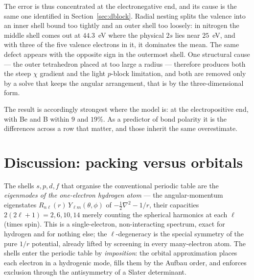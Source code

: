 \documentclass[11pt]{article}
\begin{document}
The error is thus concentrated at the electronegative end, and its cause is the same one
identified in Section~\ref{sec:dblock}. Radial nesting splits the valence into an inner
shell bound too tightly and an outer shell too loosely: in nitrogen the middle shell comes
out at $44.3$~eV where the physical $2s$ lies near $25$~eV, and with three of the five
valence electrons in it, it dominates the mean. The same defect appears with the opposite
sign in the outermost shell. One structural cause --- the outer tetrahedron placed at too
large a radius --- therefore produces both the steep $\chi$ gradient and the light
$p$-block limitation, and both are removed only by a solve that keeps the angular
arrangement, that is by the three-dimensional form.

The result is accordingly strongest where the model is: at the electropositive end, with
Be and B within $9$ and $19\%$. As a predictor of bond polarity it is the differences
across a row that matter, and those inherit the same overestimate.

\section{Discussion: packing versus orbitals}\label{sec:discussion}

The shells $s,p,d,f$ that organise the conventional periodic table are the
\emph{eigenmodes of the one-electron hydrogen atom} --- the angular-momentum
eigenstates $R_{n\ell}(r)\,Y_{\ell m}(\theta,\phi)$ of $-\tfrac12\nabla^2-1/r$, their
capacities $2(2\ell+1)=2,6,10,14$ merely counting the spherical harmonics at each $\ell$
(times spin). This is a single-electron, non-interacting spectrum, exact for hydrogen and
for nothing else; the $\ell$-degeneracy is the special symmetry of the pure $1/r$
potential, already lifted by screening in every many-electron atom. The shells enter the
periodic table by \emph{imposition}: the orbital approximation places each electron in a
hydrogenic mode, fills them by the Aufbau order, and enforces exclusion through the
antisymmetry of a Slater determinant.
\end{document}
